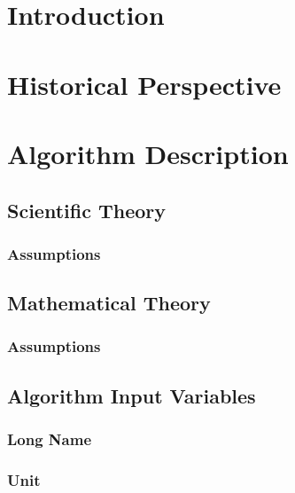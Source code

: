 \documentclass[12pt]{article}
\begin{document}
\maketitle

\tableofcontents

\section{Introduction}
\Introduction

\section{Historical Perspective}
\HistoricalPerspective

\section{Algorithm Description}
\AlgorithmDescription

\subsection{Scientific Theory}
\ScientificTheory

\subsubsection{Assumptions}
\ScientificTheoryAssumptions

\subsection{Mathematical Theory}
\MathematicalTheory

\subsubsection{Assumptions}
\MathematicalTheoryAssumptions

\subsection{Algorithm Input Variables}
\AlgorithmInputVariables

\subsubsection{Long Name}
\AlgorthimInputVariablesLongName

\subsubsection{Unit}
\AlgorthimInputVariablesUnit
\end{document}
